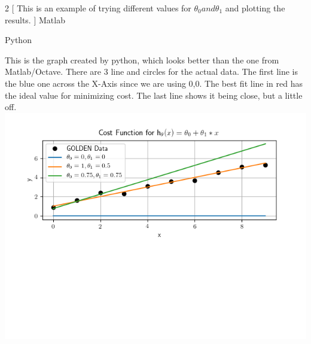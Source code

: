 \newpage
\begin{multicols}{2}
  [
    This is an example of trying different values for $\theta_{0} and \theta_{1}$ and plotting the results.
  ]
  Matlab\\
  \columnbreak

  Python\\
  
\end{multicols}

This is the graph created by python, which looks better than the one from Matlab/Octave.  There are 3 line and circles for the actual data.  The first line is the blue one across the X-Axis since we are using 0,0.  The best fit line in red has the ideal value for minimizing cost.  The last line shows it being close, but a little off.\\

\includegraphics{python/plot_cost_function.png}\\
